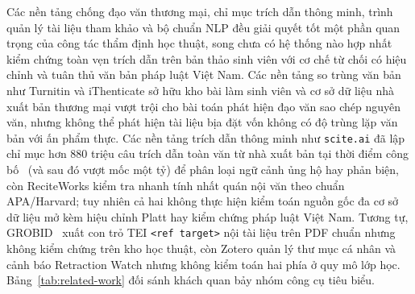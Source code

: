 Các nền tảng chống đạo văn thương mại, chỉ mục trích dẫn thông minh, trình quản lý tài liệu tham khảo và bộ chuẩn NLP đều giải quyết tốt một phần quan trọng của công tác thẩm định học thuật, song chưa có hệ thống nào hợp nhất kiểm chứng toàn vẹn trích dẫn trên bản thảo sinh viên với cơ chế từ chối có hiệu chỉnh và tuân thủ văn bản pháp luật Việt Nam. Các nền tảng so trùng văn bản như Turnitin và iThenticate sở hữu kho bài làm sinh viên và cơ sở dữ liệu nhà xuất bản thương mại vượt trội cho bài toán phát hiện đạo văn sao chép nguyên văn, nhưng không thể phát hiện tài liệu bịa đặt vốn không có độ trùng lặp văn bản với ấn phẩm thực. Các nền tảng trích dẫn thông minh như \texttt{scite.ai} đã lập chỉ mục hơn 880 triệu câu trích dẫn toàn văn từ nhà xuất bản tại thời điểm công bố~\cite{nicholson2021scite} (và sau đó vượt mốc một tỷ) để phân loại ngữ cảnh ủng hộ hay phản biện, còn ReciteWorks kiểm tra nhanh tính nhất quán nội văn theo chuẩn APA/Harvard; tuy nhiên cả hai không thực hiện kiểm toán nguồn gốc đa cơ sở dữ liệu mở kèm hiệu chỉnh Platt hay kiểm chứng pháp luật Việt Nam. Tương tự, GROBID~\cite{Lopez2009} xuất con trỏ TEI \texttt{<ref target>} nội tài liệu trên PDF chuẩn nhưng không kiểm chứng trên kho học thuật, còn Zotero quản lý thư mục cá nhân và cảnh báo Retraction Watch nhưng không kiểm toán hai phía ở quy mô lớp học. Bảng~\ref{tab:related-work} đối sánh khách quan bảy nhóm công cụ tiêu biểu.

